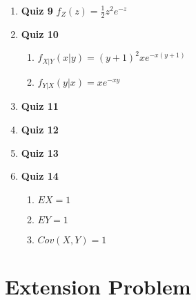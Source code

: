 \documentclass{article}
\begin{document}
\begin{enumerate}
\item \textbf{\large Quiz 9}
     $f_Z(z) = \frac{1}{2}z^2e^{-z}$



\item \textbf{\large Quiz 10}
\begin{enumerate}
    \item $f_{X|Y}(x|y) = (y+1)^2 xe^{-x(y+1)}$
    \item $f_{Y|X}(y|x) = xe^{-xy}$
\end{enumerate}

\item \textbf{\large Quiz 11}

\item \textbf{\large Quiz 12}

\item \textbf{\large Quiz 13}

\item \textbf{\large Quiz 14}
\begin{enumerate}
    \item $EX = 1$
    \item $EY = 1$
    \item $Cov(X,Y) = 1$
\end{enumerate}
\end{enumerate}


\newpage

\section{Extension Problem}

\newpage




\begin{thebibliography}{1}



\end{thebibliography}
\end{document}

